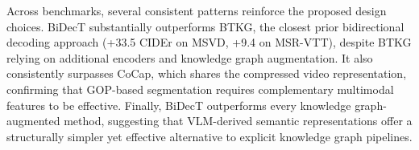 
Across benchmarks, several consistent patterns reinforce the proposed design choices. BiDecT substantially outperforms BTKG, the closest prior bidirectional decoding approach (+33.5 CIDEr on MSVD, +9.4 on MSR-VTT), despite BTKG relying on additional encoders and knowledge graph augmentation. It also consistently surpasses CoCap, which shares the compressed video representation, confirming that GOP-based segmentation requires complementary multimodal features to be effective. Finally, BiDecT outperforms every knowledge graph-augmented method, suggesting that VLM-derived semantic representations offer a structurally simpler yet effective alternative to explicit knowledge graph pipelines.


